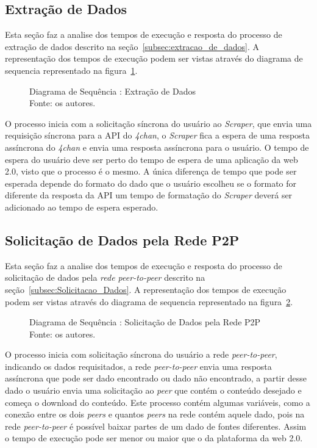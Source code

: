 \subsection{Extração de Dados}
Esta seção faz a analise dos tempos de execução e resposta do processo de extração de dados descrito na seção~\ref{subsec:extracao_de_dados}. A representação dos tempos de execução podem ser vistas através do diagrama de sequencia representado na figura~\ref{fig:seq_extracao_dados}. 
\begin{figure}[H]
    
    \caption[Diagrama de Sequência : Extração de Dados]{\label{fig:seq_extracao_dados}
        Diagrama de Sequência : Extração de Dados\\
        Fonte: os autores.
    }
\end{figure}

O processo inicia com a solicitação síncrona do usuário ao \textit{Scraper}, que envia uma requisição síncrona para a API do \textit{4chan}, o \textit{Scraper} fica a espera de uma resposta assíncrona do \textit{4chan} e envia uma resposta assíncrona para o usuário. 
O tempo de espera do usuário deve ser perto do tempo de espera de uma aplicação da web 2.0, visto que o processo é o mesmo. A única diferença de tempo que pode ser esperada depende do formato do dado que o usuário escolheu
se o formato for diferente da resposta da API um tempo de formatação do \textit{Scraper} deverá ser adicionado ao tempo de espera esperado.

\subsection{Solicitação de Dados pela Rede P2P}
Esta seção faz a analise dos tempos de execução e resposta do processo de solicitação de dados pela \textit{rede peer-to-peer} descrito na seção~\ref{subsec:Solicitacao_Dados}. A representação dos tempos de execução podem ser vistas através do diagrama de sequencia representado na figura~\ref{fig:seq_Solicitacao_dados}. 
\begin{figure}[H]
    
    \caption[Diagrama de Sequência :Solicitação de Dados pela Rede P2P]{\label{fig:seq_Solicitacao_dados}
        Diagrama de Sequência : Solicitação de Dados pela Rede P2P\\
        Fonte: os autores.
    }
\end{figure}
O processo inicia com solicitação síncrona do usuário a rede \textit{peer-to-peer}, indicando os dados
requisitados, a rede \textit{peer-to-peer} envia uma resposta assíncrona que pode ser dado encontrado ou dado não encontrado,
a partir desse dado o usuário envia uma solicitação ao \textit{peer} que contém o conteúdo desejado
e começa o download do conteúdo. Este processo contém algumas variáveis, como a conexão entre os dois \textit{peers}
e quantos \textit{peers} na rede contém aquele dado, pois na rede \textit{peer-to-peer} é possível baixar partes de um dado de fontes diferentes. Assim o tempo de execução pode ser menor ou maior que o da plataforma da web 2.0.
